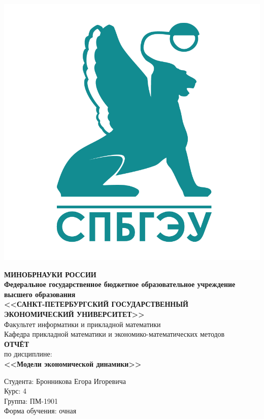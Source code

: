 \documentclass[14pt,fleqn]{extarticle}
\begin{document}
	\begin{titlepage}
		\includegraphics[scale=0.1]{logo}
		\begin{center}
			\textbf{МИНОБРНАУКИ РОССИИ}\\
			\vspace{0.2cm}
			\textbf{Федеральное государственное бюджетное образовательное учреждение высшего образования}\\
			\textbf{<<САНКТ-ПЕТЕРБУРГСКИЙ ГОСУДАРСТВЕННЫЙ ЭКОНОМИЧЕСКИЙ УНИВЕРСИТЕТ>>}\\
			\vspace{0.6cm}
			Факультет информатики и прикладной математики\\
			Кафедра прикладной математики и экономико-математических методов\\
			\vspace{1cm}
			\textbf{ОТЧЁТ}\\
			по дисциплине:\\
			\textbf{<<Модели экономической динамики>>}\\
		\end{center}
		\vspace{1cm}
		Студента: Бронникова Егора Игоревича\\
		Курс: 4\\
		Группа: ПМ-1901\\
		Форма обучения: очная\\

\end{titlepage}
\end{document}
